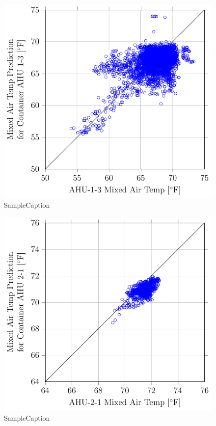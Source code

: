 \begin{figure}
\centering
\includegraphics[]{Plots/2016-09-07-1346-MixedAirTempPredictionforContainerAHU13vsAHU13MixedAirTemp.pdf}
\caption{SampleCaption}
\label{fig:2016-09-07-1346-MixedAirTempPredictionforContainerAHU13vsAHU13MixedAirTemp}
\end{figure}

\begin{figure}
\centering
\includegraphics[]{Plots/2016-09-07-1357-MixedAirTempPredictionforContainerAHU21vsAHU21MixedAirTemp.pdf}
\caption{SampleCaption}
\label{fig:2016-09-07-1357-MixedAirTempPredictionforContainerAHU21vsAHU21MixedAirTemp}
\end{figure}

